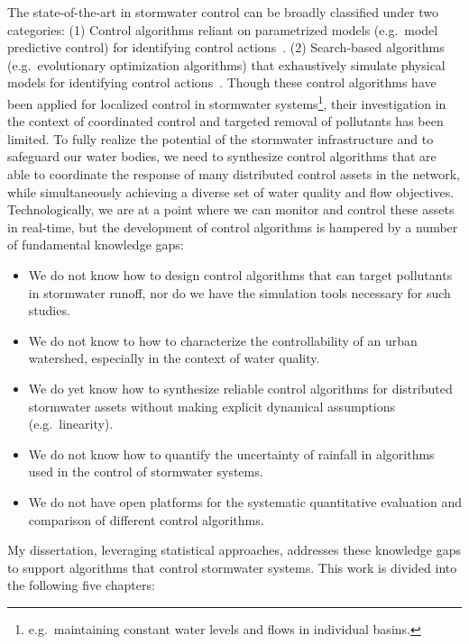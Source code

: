 The state-of-the-art in stormwater control  can be broadly classified under two categories: (1) Control algorithms reliant on parametrized models (e.g.\ model predictive control) for identifying control actions~\cite{Wong_Kerkez_2018, Ocampo-Martinez_2015,joseph2014hybrid, Sun_2020, lund2020cso}. (2) Search-based algorithms (e.g.\ evolutionary optimization algorithms) that exhaustively simulate physical models for identifying control actions~\cite{shishegar2018optimization,sadler2019, lund2018, Rjeily_2018, Meneses_2018, vezzaro2014}.
Though these control algorithms have been applied for localized control in stormwater systems\footnote{e.g.\ maintaining constant water levels and flows in individual basins.}, their investigation in the context of coordinated control and targeted removal of pollutants has been limited.
To fully realize the potential of the stormwater infrastructure and to safeguard our water bodies, we need to synthesize control algorithms that are able to coordinate the response of many distributed control assets in the network, while simultaneously achieving a diverse set of water quality and flow objectives. 
Technologically, we are at a point where we can monitor and control these assets in real-time, but the development of control algorithms is hampered by a number of fundamental knowledge gaps:
\begin{itemize}
	\item We do not know how to design control algorithms that can target pollutants in stormwater runoff, nor do we have the simulation tools necessary for such studies.
	\item We do not know to how to characterize the controllability of an urban watershed, especially in the context of water quality.
	\item We do yet know how to synthesize reliable control algorithms for distributed stormwater assets without making explicit dynamical assumptions (e.g.\ linearity).
	\item We do not know how to quantify the uncertainty of rainfall in algorithms used in the control of stormwater systems.
	\item We do not have open platforms for the systematic quantitative evaluation and comparison of different control algorithms.
\end{itemize}

My dissertation, leveraging statistical approaches, addresses these knowledge gaps to support algorithms that control stormwater systems. This work is divided into the following five chapters:

